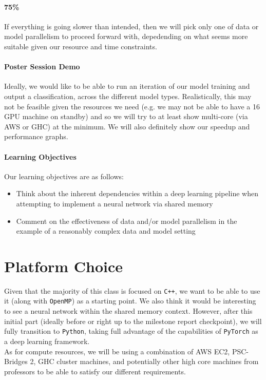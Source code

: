 \documentclass{article}
\begin{document}
\paragraph{75\%} If everything is going slower than intended, then we will pick only one of data or model parallelism to proceed forward with, depedending on what seems more suitable given our resource and time constraints.

\paragraph{Poster Session Demo} Ideally, we would like to be able to run an iteration of our model training and output a classification, across the different model types. Realistically, this may not be feasible given the resources we need (e.g. we may not be able to have a 16 GPU machine on standby) and so we will try to at least show multi-core (via AWS or GHC) at the minimum. We will also definitely show our speedup and performance graphs.

\paragraph{Learning Objectives} Our learning objectives are as follows:

\begin{itemize}
  \item Think about the inherent dependencies within a deep learning pipeline when attempting to implement a neural network via shared memory
  \item Comment on the effectiveness of data and/or model parallelism in the example of a reasonably complex data and model setting
\end{itemize}

\section*{Platform Choice} Given that the majority of this class is focused on \texttt{C++}, we want to be able to use it (along with \texttt{OpenMP}) as a starting point. We also think it would be interesting to see a neural network within the shared memory context. However, after this initial part (ideally before or right up to the milestone report checkpoint), we will fully transition to \texttt{Python}, taking full advantage of the capabilities of \texttt{PyTorch} as a deep learning framework. \\

As for compute resources, we will be using a combination of AWS EC2, PSC-Bridges 2, GHC cluster machines, and potentially other high core machines from professors to be able to satisfy our different requirements.
\end{document}
